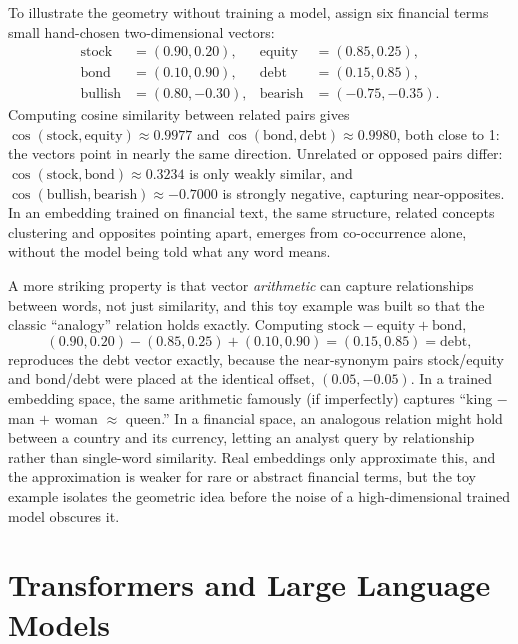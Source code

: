 \documentclass[../ai_in_finance]{subfiles}
\begin{document}
To illustrate the geometry without training a model, assign six financial terms small hand-chosen two-dimensional vectors:
\begin{align*}
\text{stock} &= (0.90, 0.20), & \text{equity} &= (0.85, 0.25), \\
\text{bond} &= (0.10, 0.90), & \text{debt} &= (0.15, 0.85), \\
\text{bullish} &= (0.80, -0.30), & \text{bearish} &= (-0.75, -0.35).
\end{align*}
Computing cosine similarity between related pairs gives $\cos(\text{stock}, \text{equity}) \approx 0.9977$ and $\cos(\text{bond}, \text{debt}) \approx 0.9980$, both close to 1: the vectors point in nearly the same direction. Unrelated or opposed pairs differ: $\cos(\text{stock}, \text{bond}) \approx 0.3234$ is only weakly similar, and $\cos(\text{bullish}, \text{bearish}) \approx -0.7000$ is strongly negative, capturing near-opposites. In an embedding trained on financial text, the same structure, related concepts clustering and opposites pointing apart, emerges from co-occurrence alone, without the model being told what any word means.

A more striking property is that vector \emph{arithmetic} can capture relationships between words, not just similarity, and this toy example was built so that the classic ``analogy'' relation holds exactly. Computing $\text{stock} - \text{equity} + \text{bond}$,
\begin{equation*}
(0.90, 0.20) - (0.85, 0.25) + (0.10, 0.90) = (0.15, 0.85) = \text{debt},
\end{equation*}
reproduces the debt vector exactly, because the near-synonym pairs stock/equity and bond/debt were placed at the identical offset, $(0.05, -0.05)$. In a trained embedding space, the same arithmetic famously (if imperfectly) captures ``king $-$ man $+$ woman $\approx$ queen.'' In a financial space, an analogous relation might hold between a country and its currency, letting an analyst query by relationship rather than single-word similarity. Real embeddings only approximate this, and the approximation is weaker for rare or abstract financial terms, but the toy example isolates the geometric idea before the noise of a high-dimensional trained model obscures it.

\section{Transformers and Large Language Models}
\end{document}
